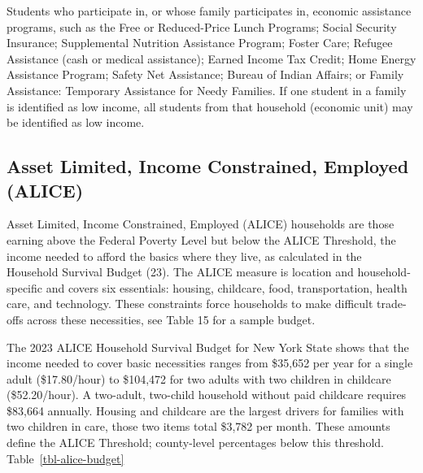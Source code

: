 \documentclass[
  english,
  letterpaper,
]{report}
\begin{document}
\begin{tcolorbox}[enhanced jigsaw, breakable, leftrule=.75mm, title=\textcolor{quarto-callout-note-color}{\faInfo}\hspace{0.5em}{Note}, bottomrule=.15mm, opacityback=0, left=2mm, colback=white, bottomtitle=1mm, coltitle=black, colbacktitle=quarto-callout-note-color!10!white, colframe=quarto-callout-note-color-frame, opacitybacktitle=0.6, toptitle=1mm, titlerule=0mm, arc=.35mm, rightrule=.15mm, toprule=.15mm]

Students who participate in, or whose family participates in, economic
assistance programs, such as the Free or Reduced-Price Lunch Programs;
Social Security Insurance; Supplemental Nutrition Assistance Program;
Foster Care; Refugee Assistance (cash or medical assistance); Earned
Income Tax Credit; Home Energy Assistance Program; Safety Net
Assistance; Bureau of Indian Affairs; or Family Assistance: Temporary
Assistance for Needy Families. If one student in a family is identified
as low income, all students from that household (economic unit) may be
identified as low income.

\end{tcolorbox}

\subsection{Asset Limited, Income Constrained, Employed
(ALICE)}\label{asset-limited-income-constrained-employed-alice}

Asset Limited, Income Constrained, Employed (ALICE) households are those
earning above the Federal Poverty Level but below the ALICE Threshold,
the income needed to afford the basics where they live, as calculated in
the Household Survival Budget (23). The ALICE measure is location and
household-specific and covers six essentials: housing, childcare, food,
transportation, health care, and technology. These constraints force
households to make difficult trade-offs across these necessities, see
Table 15 for a sample budget.

The 2023 ALICE Household Survival Budget for New York State shows that
the income needed to cover basic necessities ranges from \$35,652 per
year for a single adult (\$17.80/hour) to \$104,472 for two adults with
two children in childcare (\$52.20/hour). A two-adult, two-child
household without paid childcare requires \$83,664 annually. Housing and
childcare are the largest drivers for families with two children in
care, those two items total \$3,782 per month. These amounts define the
ALICE Threshold; county-level percentages below this threshold.
Table~\ref{tbl-alice-budget}
\end{document}
